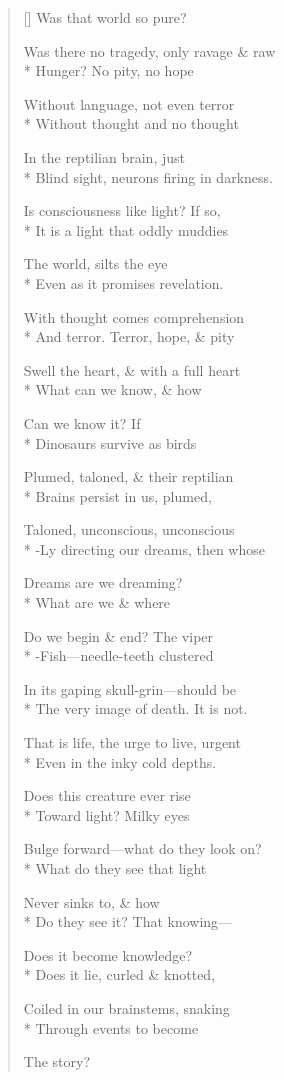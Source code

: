 \label{ch:the_age_of_dinosaurs}
\settowidth{\versewidth}{Can we know it? \qquad If                                                       }
\begin{verse}[\versewidth]
Was that world so pure?

Was there no tragedy, only ravage \& raw\\*
Hunger?     No pity, no hope

Without language, not even terror\\*
Without thought   and no thought

In the reptilian brain, just\\*
Blind sight, neurons firing in darkness.

Is consciousness like light?   If so,\\*
It is a light that oddly muddies

The world, silts the eye\\*
Even as it promises revelation.

With thought comes comprehension\\*
And terror. Terror, hope, \& pity

Swell the heart, \& with a full heart\\*
What can we know, \& how

Can we know it? \qquad If                                                       \\*
Dinosaurs survive as birds

Plumed, taloned, \& their reptilian\\*
Brains persist in us, plumed,

Taloned, unconscious, unconscious\\*
-Ly directing our dreams, then whose

Dreams are we dreaming?\\*
What are we \& where

Do we begin \& end?   The viper\\*
-Fish---needle-teeth clustered

In its gaping skull-grin---should be\\*
The very image of death. It is not.

That is life, the urge to live, urgent\\*
Even in the inky cold depths.

Does this creature ever rise\\*
Toward light? \qquad Milky eyes

Bulge forward---what do they look on?\\*
What do they see that light

Never sinks to,   \& how\\*
Do they see it?   That knowing---

Does it become knowledge?\\*
Does it lie, curled \& knotted,

Coiled in our brainstems, snaking\\*
Through events to become

The story?
\end{verse}
